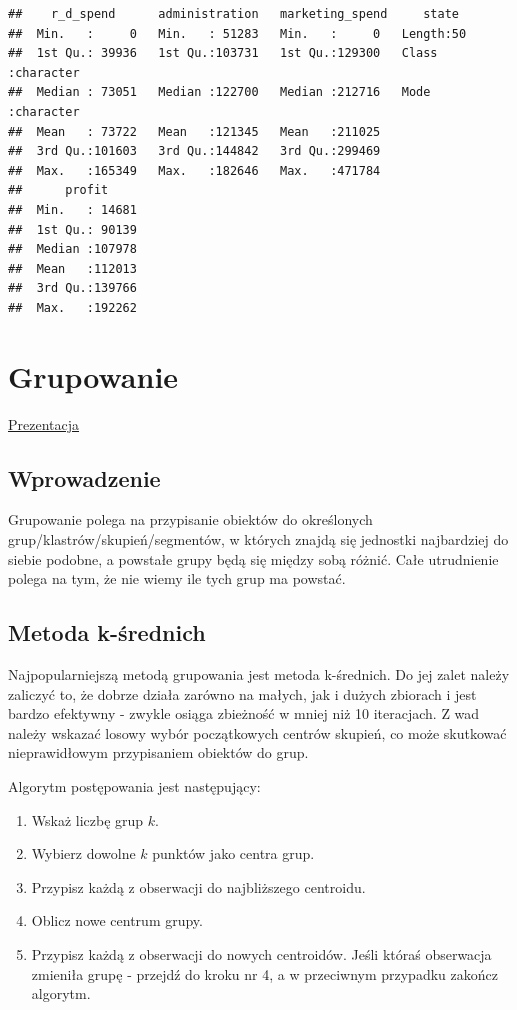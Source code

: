 \documentclass[
]{book}
\providecommand{\tightlist}{%
  \setlength{\itemsep}{0pt}\setlength{\parskip}{0pt}}
\begin{document}
\begin{verbatim}
##    r_d_spend      administration   marketing_spend     state          
##  Min.   :     0   Min.   : 51283   Min.   :     0   Length:50         
##  1st Qu.: 39936   1st Qu.:103731   1st Qu.:129300   Class :character  
##  Median : 73051   Median :122700   Median :212716   Mode  :character  
##  Mean   : 73722   Mean   :121345   Mean   :211025                     
##  3rd Qu.:101603   3rd Qu.:144842   3rd Qu.:299469                     
##  Max.   :165349   Max.   :182646   Max.   :471784                     
##      profit      
##  Min.   : 14681  
##  1st Qu.: 90139  
##  Median :107978  
##  Mean   :112013  
##  3rd Qu.:139766  
##  Max.   :192262
\end{verbatim}

\hypertarget{grupowanie}{%
\chapter{Grupowanie}\label{grupowanie}}

\href{presentations/05_grupowanie.html}{Prezentacja}

\hypertarget{wprowadzenie-3}{%
\section{Wprowadzenie}\label{wprowadzenie-3}}

Grupowanie polega na przypisanie obiektów do określonych grup/klastrów/skupień/segmentów, w których znajdą się jednostki najbardziej do siebie podobne, a powstałe grupy będą się między sobą różnić. Całe utrudnienie polega na tym, że nie wiemy ile tych grup ma powstać.

\hypertarget{metoda-k-ux15brednich}{%
\section{Metoda k-średnich}\label{metoda-k-ux15brednich}}

Najpopularniejszą metodą grupowania jest metoda k-średnich. Do jej zalet należy zaliczyć to, że dobrze działa zarówno na małych, jak i dużych zbiorach i jest bardzo efektywny - zwykle osiąga zbieżność w mniej niż 10 iteracjach. Z wad należy wskazać losowy wybór początkowych centrów skupień, co może skutkować nieprawidłowym przypisaniem obiektów do grup.

Algorytm postępowania jest następujący:

\begin{enumerate}
\def\labelenumi{\arabic{enumi}.}
\tightlist
\item
  Wskaż liczbę grup \(k\).
\item
  Wybierz dowolne \(k\) punktów jako centra grup.
\item
  Przypisz każdą z obserwacji do najbliższego centroidu.
\item
  Oblicz nowe centrum grupy.
\item
  Przypisz każdą z obserwacji do nowych centroidów. Jeśli któraś obserwacja zmieniła grupę - przejdź do kroku nr 4, a w przeciwnym przypadku zakończ algorytm.
\end{enumerate}
\end{document}

